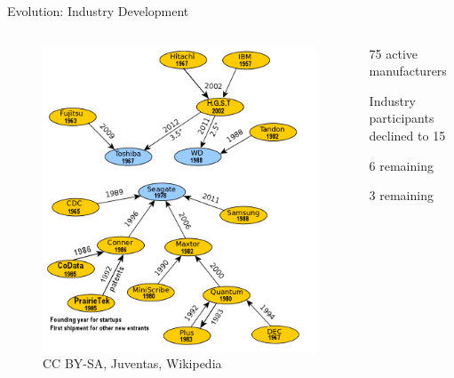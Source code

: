 \documentclass[12pt]{beamer}
\newlength{\wideitemsep}
\let\olditem\item
\renewcommand{\item}{\setlength{\itemsep}{\wideitemsep}\olditem}
\begin{document}
\begin{frame}[fragile]{Evolution: Industry Development}

	\begin{columns}[c]
	\begin{column}[c]{.45\textwidth}	
 		\begin{figure}[p]
	 		\centering
	 		\includegraphics[width=\linewidth]{img/diagram_manufacturer.png}
	 			\caption{CC BY-SA, Juventas, Wikipedia}
 		\end{figure}
 	\end{column}
 	
 	\begin{column}[c]{.55\textwidth}	
 		\begin{description}
 			\item[1985] 75 active manufacturers
			\item[1999] Industry participants declined to 15
			\item[2009] 6 remaining
			\item[2012] 3 remaining
 		\end{description}
 	\end{column}
 	\end{columns}
 	
\end{frame}
\end{document}
